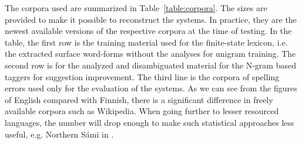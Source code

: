 \documentclass{llncs}
\begin{document}

The corpora used are summarized in Table~\ref{table:corpora}. The sizes are
provided to make it possible to reconstruct the systems. In practice, they are the newest
available versions of the respective corpora at the time of testing. In the
table, the first row is the training material used for the finite-state
lexicon, i.e. the extracted surface word-forms without the analyses for unigram
training. The second row is for the analyzed and disambiguated material for the
N-gram based taggers for suggestion improvement. The third line is the corpora
of spelling errors used only for the evaluation of the systems.  As we can see
from the figures of English compared with Finnish, there is a significant
difference in freely available corpora such as Wikipedia. When going further to
lesser resourced languages, the number will drop enough to make such statistical
approaches less useful, e.g. Northern S\'{a}mi in \cite{pirinen/2010/lrec}.
\end{document}
